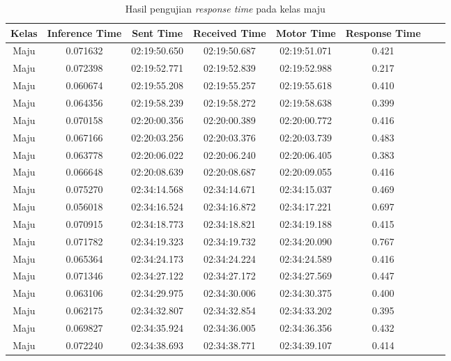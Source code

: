 \begin{longtable}{|c|c|c|c|c|c|c|c|}
  \caption{Hasil pengujian \emph{response time} pada kelas maju} 
  \label{tb:delaymaju} \\
  \hline
  \rowcolor[HTML]{C0C0C0} 
      \textbf{Kelas} & \textbf{Inference Time} & \textbf{Sent Time} & \textbf{Received Time} & \textbf{Motor Time} & \textbf{Response Time} \\ \hline
      Maju & 0.071632 & 02:19:50.650 & 02:19:50.687 & 02:19:51.071 & 0.421 \\ \hline
      Maju & 0.072398 & 02:19:52.771 & 02:19:52.839 & 02:19:52.988 & 0.217 \\ \hline
      Maju & 0.060674 & 02:19:55.208 & 02:19:55.257 & 02:19:55.618 & 0.410 \\ \hline
      Maju & 0.064356 & 02:19:58.239 & 02:19:58.272 & 02:19:58.638 & 0.399 \\ \hline
      Maju & 0.070158 & 02:20:00.356 & 02:20:00.389 & 02:20:00.772 & 0.416 \\ \hline
      Maju & 0.067166 & 02:20:03.256 & 02:20:03.376 & 02:20:03.739 & 0.483 \\ \hline
      Maju & 0.063778 & 02:20:06.022 & 02:20:06.240 & 02:20:06.405 & 0.383 \\ \hline
      Maju & 0.066648 & 02:20:08.639 & 02:20:08.687 & 02:20:09.055  & 0.416 \\ \hline
      Maju & 0.075270 & 02:34:14.568 & 02:34:14.671 & 02:34:15.037 & 0.469 \\ \hline
      Maju & 0.056018 & 02:34:16.524 & 02:34:16.872  & 02:34:17.221 & 0.697 \\ \hline
      Maju & 0.070915 & 02:34:18.773 & 02:34:18.821 & 02:34:19.188 & 0.415 \\ \hline
      Maju & 0.071782 & 02:34:19.323 & 02:34:19.732 & 02:34:20.090 & 0.767 \\ \hline
      Maju & 0.065364 & 02:34:24.173 & 02:34:24.224  & 02:34:24.589  & 0.416 \\ \hline
      Maju & 0.071346 & 02:34:27.122 & 02:34:27.172 & 02:34:27.569 & 0.447 \\ \hline
      Maju & 0.063106 & 02:34:29.975 & 02:34:30.006 & 02:34:30.375 & 0.400 \\ \hline
      Maju & 0.062175 & 02:34:32.807 & 02:34:32.854 & 02:34:33.202 & 0.395 \\ \hline
      Maju & 0.069827 & 02:34:35.924 & 02:34:36.005 & 02:34:36.356 & 0.432 \\ \hline
      Maju & 0.072240 & 02:34:38.693 & 02:34:38.771 & 02:34:39.107 & 0.414 \\ \hline

\end{longtable}
